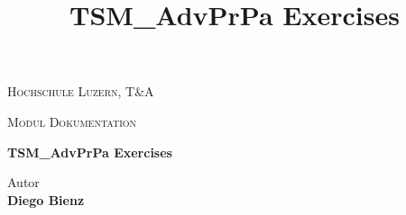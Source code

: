 
\begin{center}
\vspace{1.5cm}
{\scshape\LARGE Hochschule Luzern, T\&A \par}
{\scshape\Large Modul Dokumentation\par}
\vspace{2.0cm}
\title{TSM\_AdvPrPa Exercises}
{\huge\bfseries TSM\_AdvPrPa Exercises\par}

\vspace{16.0cm}

\end{center}

Autor \\
\textbf{Diego Bienz} \\


